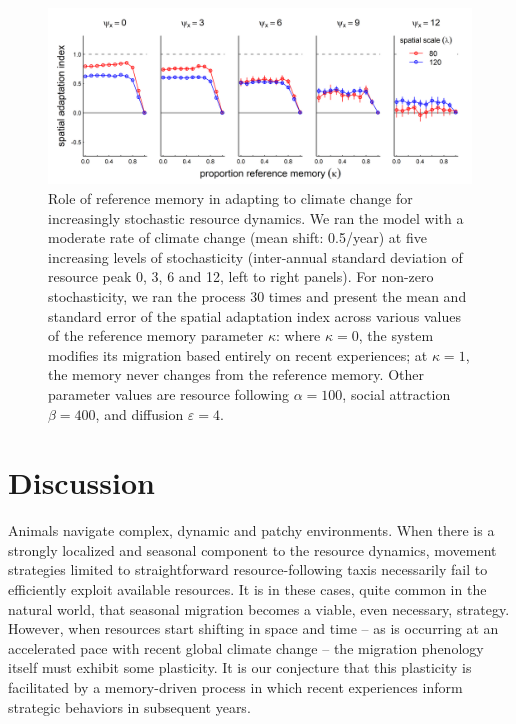 \documentclass[utf8]{frontiersSCNS} %
\begin{document}
	\begin{figure}
		
		\includegraphics[width=\textwidth]{figures/TrendStochasticity.png}
		
		\caption{ \label{fig_trendstochasticity} Role of reference memory in adapting to climate change for increasingly stochastic resource dynamics. We ran the model with a moderate rate of climate change (mean shift: 0.5/year) at five increasing levels of stochasticity (inter-annual standard deviation of resource peak 0, 3, 6 and 12, left to right panels). For non-zero stochasticity, we ran the process 30 times and present the mean and standard error of the spatial adaptation index across various values of the reference memory parameter $\kappa$: where $\kappa = 0$, the system modifies its migration based entirely on recent experiences; at $\kappa = 1$, the memory never changes from the reference memory. Other parameter values are resource following $\alpha = 100$, social attraction $\beta = 400$, and diffusion $\varepsilon = 4$.}
		
	\end{figure}
	
\section{Discussion}
	
	Animals navigate complex, dynamic and patchy environments. When there is a strongly localized and seasonal component to the resource dynamics, movement strategies limited to straightforward resource-following taxis necessarily fail to efficiently exploit available resources. It is in these cases, quite common in the natural world, that seasonal migration becomes a viable, even necessary, strategy.  However, when resources start shifting in space and time -- as is occurring at an accelerated pace with recent global climate change -- the migration phenology itself must exhibit some plasticity. It is our conjecture that this plasticity is facilitated by a memory-driven process in which recent experiences inform strategic behaviors in subsequent years. 
	
\end{document}

